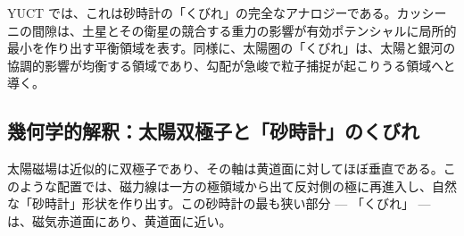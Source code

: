\documentclass[11pt,a4paper]{article}
\theoremstyle{remark}
\begin{document}
	YUCT では、これは砂時計の「くびれ」の完全なアナロジーである。カッシーニの間隙は、土星とその衛星の競合する重力の影響が有効ポテンシャルに局所的最小を作り出す平衡領域を表す。同様に、太陽圏の「くびれ」は、太陽と銀河の協調的影響が均衡する領域であり、勾配が急峻で粒子捕捉が起こりうる領域へと導く。
	
	\subsection{幾何学的解釈：太陽双極子と「砂時計」のくびれ}
	\label{subsec:coord:dipole_geometry}
	
	太陽磁場は近似的に双極子であり、その軸は黄道面に対してほぼ垂直である。このような配置では、磁力線は一方の極領域から出て反対側の極に再進入し、自然な「砂時計」形状を作り出す。この砂時計の最も狭い部分 — 「くびれ」 — は、磁気赤道面にあり、黄道面に近い。
	
\end{document}
